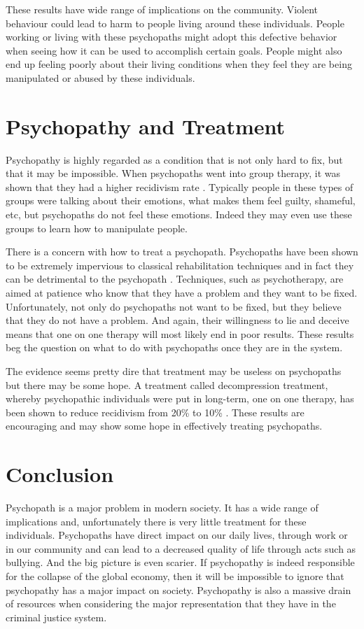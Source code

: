 \documentclass[12pt,jou]{apa}
\begin{document}
These results have wide range of implications on the community. Violent behaviour could lead to harm to people living around these individuals. People working or living with these psychopaths might adopt this defective behavior when seeing how it can be used to accomplish certain goals. People might also end up feeling poorly about their living conditions when they feel they are being manipulated or abused by these individuals.

\section{Psychopathy and Treatment}

Psychopathy is highly regarded as a condition that is not only hard to fix, but that it may be impossible. When psychopaths went into group therapy, it was shown that they had a higher recidivism rate \cite<as cite in>{crimpsych}. Typically people in these types of groups were talking about their emotions, what makes them feel guilty, shameful, etc, but psychopaths do not feel these emotions. Indeed they may even use these groups to learn how to manipulate people. 

There is a concern with how to treat a psychopath. Psychopaths have been shown to be extremely impervious to classical rehabilitation techniques and in fact they can be detrimental to the psychopath \cite{crimpsych}. Techniques, such as psychotherapy, are aimed at patience who know that they have a problem and they want to be fixed. Unfortunately, not only do psychopaths not want to be fixed, but they believe that they do not have a problem. And again, their willingness to lie and deceive means that one on one therapy will most likely end in poor results. These results beg the question on what to do with psychopaths once they are in the system.

The evidence seems pretty dire that treatment may be useless on psychopaths but there may be some hope. A treatment called decompression treatment, whereby psychopathic individuals were put in long-term, one on one therapy, has been shown to reduce recidivism from 20\% to 10\% \cite<as cited in>{crimpsych}. These results are encouraging and may show some hope in effectively treating psychopaths.
\section{Conclusion}

Psychopath is a major problem in modern society. It has a wide range of implications and, unfortunately there is very little treatment for these individuals. Psychopaths have direct impact on our daily lives, through work or in our community and can lead to a decreased quality of life through acts such as bullying. And the big picture is even scarier. If psychopathy is indeed responsible for the collapse of the global economy, then it will be impossible to ignore that psychopathy has a major impact on society. Psychopathy is also a massive drain of resources when considering the major representation that they have in the criminal justice system.
\newpage

\end{document}
